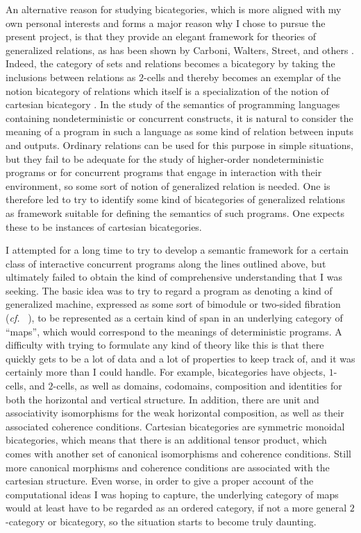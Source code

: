 \documentclass[11pt,notitlepage,a4paper]{report}
\begin{document}
An alternative reason for studying bicategories, which is more aligned with my own
personal interests and forms a major reason why I chose to pursue the present project,
is that they provide an elegant framework for theories of generalized relations,
as has been shown by Carboni, Walters, Street, and others \cite{carboni-et-al}
\cite{cartesian-bicategories-i} \cite{cartesian-bicategories-ii} \cite{carboni-partial-maps}.
Indeed, the category of sets and relations becomes a bicategory by taking the inclusions
between relations as $2$-cells and thereby becomes an exemplar of the notion
bicategory of relations which itself is a specialization of the notion of
cartesian bicategory \cite{cartesian-bicategories-i} \cite{cartesian-bicategories-ii}.
In the study of the semantics of programming languages containing nondeterministic or
concurrent constructs, it is natural to consider the meaning of a program in such a language
as some kind of relation between inputs and outputs.  Ordinary relations can be used for
this purpose in simple situations, but they fail to be adequate for the study of higher-order
nondeterministic programs or for concurrent programs that engage in interaction with their environment,
so some sort of notion of generalized relation is needed.  One is therefore led to try to identify
some kind of bicategories of generalized relations as framework suitable for defining the
semantics of such programs.  One expects these to be instances of cartesian bicategories.

I attempted for a long time to try to develop a semantic framework for a certain class of
interactive concurrent programs along the lines outlined above, but ultimately failed to obtain
the kind of comprehensive understanding that I was seeking.  The basic idea was to try to
regard a program as denoting a kind of generalized machine, expressed as some sort of
bimodule or two-sided fibration ({\em cf.}~\cite{street-fibrations-i} \cite{street-fibrations-ii}),
to be represented as a certain kind of span in an underlying category of ``maps'',
which would correspond to the meanings of deterministic programs.
A difficulty with trying to formulate any kind of theory like this is that there quickly gets
to be a lot of data and a lot of properties to keep track of, and it was certainly more than
I could handle.
For example, bicategories have objects, $1$-cells, and $2$-cells, as well as domains, codomains,
composition and identities for both the horizontal and vertical structure.
In addition, there are unit and associativity isomorphisms for the weak horizontal composition,
as well as their associated coherence conditions.
Cartesian bicategories are symmetric monoidal bicategories, which means that there is an additional
tensor product, which comes with another set of canonical isomorphisms and coherence conditions.
Still more canonical morphisms and coherence conditions are associated with the cartesian structure.
Even worse, in order to give a proper account of the computational ideas I was hoping to capture,
the underlying category of maps would at least have to be regarded as an ordered category,
if not a more general $2$-category or bicategory, so the situation starts to become truly daunting.
\end{document}
